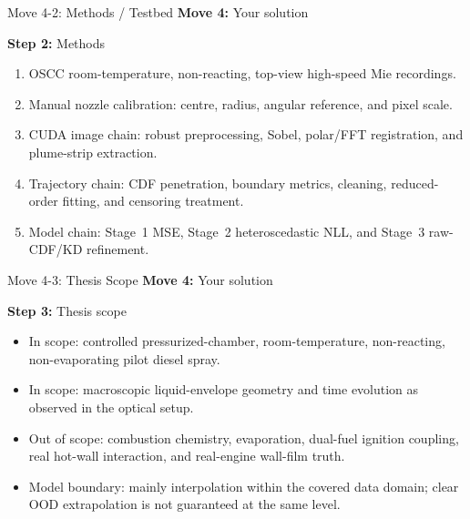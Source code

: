 \documentclass[aspectratio=169,11pt]{beamer}
\newcommand{\movetag}[2]{\textbf{Move #1:} #2}
\newcommand{\steptag}[2]{\textbf{Step #1:} #2}
\begin{document}
\begin{frame}{Move 4-2: Methods / Testbed}
\footnotesize
\movetag{4}{Your solution}

\vspace{0.5em}
\steptag{2}{Methods}

\vspace{0.5em}
\begin{enumerate}
  \item OSCC room-temperature, non-reacting, top-view high-speed Mie recordings.
  \item Manual nozzle calibration: centre, radius, angular reference, and pixel scale.
  \item CUDA image chain: robust preprocessing, Sobel, polar/FFT registration, and plume-strip extraction.
  \item Trajectory chain: CDF penetration, boundary metrics, cleaning, reduced-order fitting, and censoring treatment.
  \item Model chain: Stage~1 MSE, Stage~2 heteroscedastic NLL, and Stage~3 raw-CDF/KD refinement.
\end{enumerate}
\end{frame}

\begin{frame}{Move 4-3: Thesis Scope}
\small
\movetag{4}{Your solution}

\vspace{0.5em}
\steptag{3}{Thesis scope}

\vspace{0.8em}
\begin{itemize}
  \item In scope: controlled pressurized-chamber, room-temperature, non-reacting, non-evaporating pilot diesel spray.
  \item In scope: macroscopic liquid-envelope geometry and time evolution as observed in the optical setup.
  \item Out of scope: combustion chemistry, evaporation, dual-fuel ignition coupling, real hot-wall interaction, and real-engine wall-film truth.
  \item Model boundary: mainly interpolation within the covered data domain; clear OOD extrapolation is not guaranteed at the same level.
\end{itemize}
\end{frame}
\end{document}
